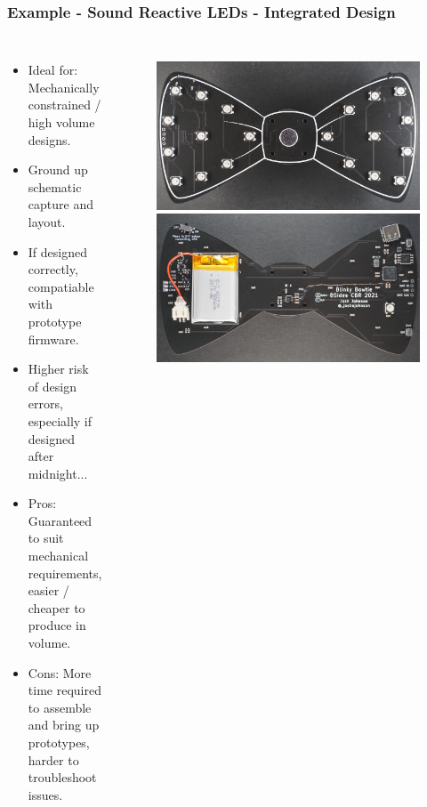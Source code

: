 \documentclass[aspectratio=169, t]{beamer}
\begin{document}
\begin{frame}
\frametitle{Example - Sound Reactive LEDs - Integrated Design}
\vspace{-5mm}
\begin{columns}
	\begin{itemize}
		\item Ideal for: Mechanically constrained / high volume designs.
		\item Ground up schematic capture and layout.
		\item If designed correctly, compatiable with prototype firmware.
		\item Higher risk of design errors, especially if designed after midnight...
		\item Pros: Guaranteed to suit mechanical requirements, easier / cheaper to produce in volume.
		\item Cons: More time required to assemble and bring up prototypes, harder to troubleshoot issues.
	\end{itemize}
	\begin{figure}
		\includegraphics[width=0.8\linewidth]{images/bowtie-front.JPG}
		\includegraphics[width=0.8\linewidth]{images/bowtie-back.JPG}
	\end{figure}
\end{columns}
\end{frame}
\end{document}
